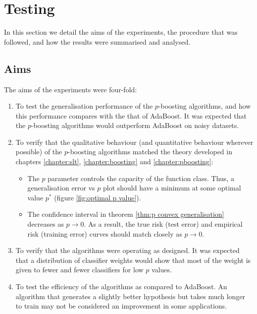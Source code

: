 \section{Testing}

In this section we detail the aims of the experiments, the procedure
that was followed, and how the results were summarised and analysed.

\subsection{Aims}
The aims of the experiments were four-fold:
%
\begin{enumerate}
\item	To test the generalisation performance of the $p$-boosting
	algorithms, and how this performance compares with the
	that of AdaBoost.  It was expected that the $p$-boosting
	algorithms would outperform AdaBoost on noisy datasets.

\item	To verify that the qualitative behaviour (and quantitative
	behaviour wherever possible) of the $p$-boosting algorithms
	matched the theory developed in chapters \ref{chapter:slt},
	\ref{chapter:boosting} and \ref{chapter:pboosting}:
	\begin{itemize}
	\item	The $p$ parameter controls the capacity of the
		function class.  Thus, a generalisation error vs $p$
		plot should have a minimum at some optimal value
		$p^{\ast}$ (figure \ref{fig:optimal p value}).
	\item	The confidence interval in theorem \ref{thm:p convex
		generalisation} decreases as $p \rightarrow 0$.  As a
		result, the true risk (test error) and empirical risk 
		(training error) curves should match closely as $p
		\rightarrow 0$.
	\end{itemize}
	
\item	To verify that the algorithms were operating as designed.
	It was expected that a distribution of classifier weights
	would show that most of the weight is given to fewer and fewer
	classifiers for low $p$ values.

\item	To test the efficiency of the algorithms as compared to
	AdaBoost.  An algorithm that generates a slightly better
	hypothesis but takes much longer to train may not be
	considered an improvement in some applications.
\end{enumerate}


